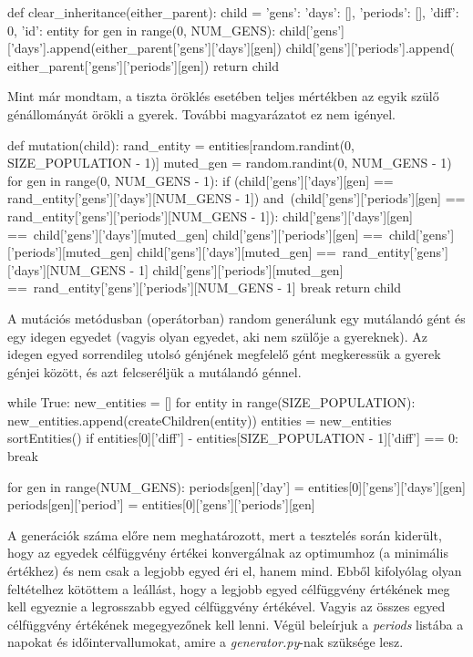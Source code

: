 \begin{python}
def clear_inheritance(either_parent):
    child = {'gens': {'days': [], 'periods': []}, 
             'diff': 0, 'id': entity}
    for gen in range(0, NUM_GENS):
        child['gens']['days'].append(either_parent['gens']['days'][gen])
        child['gens']['periods'].append(
            either_parent['gens']['periods'][gen])
    return child
\end{python}

Mint már mondtam, a tiszta öröklés esetében teljes mértékben az egyik szülő génállományát örökli a gyerek. További magyarázatot ez nem igényel.

\begin{python}
def mutation(child):
    rand_entity = entities[random.randint(0, SIZE_POPULATION - 1)]
    muted_gen = random.randint(0, NUM_GENS - 1)
    for gen in range(0, NUM_GENS - 1):
        if (child['gens']['days'][gen] ==
           rand_entity['gens']['days'][NUM_GENS - 1]) and\
           (child['gens']['periods'][gen] ==
           rand_entity['gens']['periods'][NUM_GENS - 1]):
            child['gens']['days'][gen] ==\
                child['gens']['days'][muted_gen]
            child['gens']['periods'][gen] ==\
                child['gens']['periods'][muted_gen]
            child['gens']['days'][muted_gen] ==\
                rand_entity['gens']['days'][NUM_GENS - 1]
            child['gens']['periods'][muted_gen] ==\
                rand_entity['gens']['periods'][NUM_GENS - 1]
            break
    return child
\end{python}

A mutációs metódusban (operátorban) random generálunk egy mutálandó gént és egy idegen egyedet (vagyis olyan egyedet, aki nem szülője a gyereknek). Az idegen egyed sorrendileg utolsó génjének megfelelő gént megkeressük a gyerek génjei között, és azt felcseréljük a mutálandó génnel.

\begin{python}
while True:
    new_entities = []
    for entity in range(SIZE_POPULATION):
        new_entities.append(createChildren(entity))
    entities = new_entities
    sortEntities()
    if entities[0]['diff'] - entities[SIZE_POPULATION - 1]['diff'] == 0:
        break

for gen in range(NUM_GENS):
    periods[gen]['day'] = entities[0]['gens']['days'][gen]
    periods[gen]['period'] = entities[0]['gens']['periods'][gen]
\end{python}

A generációk száma előre nem meghatározott, mert a tesztelés során kiderült, hogy az egyedek célfüggvény értékei konvergálnak az optimumhoz (a minimális értékhez) és nem csak a legjobb egyed éri el, hanem mind. Ebből kifolyólag olyan feltételhez kötöttem a leállást, hogy a legjobb egyed célfüggvény értékének meg kell egyeznie a legrosszabb egyed célfüggvény értékével. Vagyis az összes egyed célfüggvény értékének megegyezőnek kell lenni. Végül beleírjuk a \textit{periods} listába a napokat és időintervallumokat, amire a \textit{generator.py}-nak szüksége lesz.


